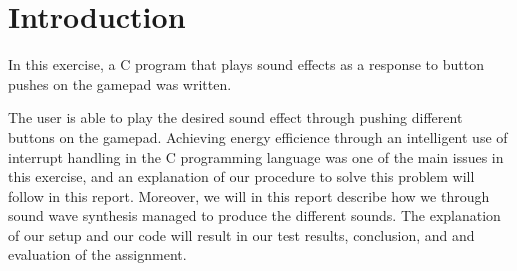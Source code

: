 \section{Introduction}

In this exercise, a C program that plays sound effects as a response to button pushes on the gamepad was written.

The user is able to play the desired sound effect through pushing different buttons on the gamepad.
Achieving energy efficience through an intelligent use of interrupt handling in the C programming language was one of the main issues in this exercise, and an explanation of our procedure to solve this problem will follow in this report.
Moreover, we will in this report describe how we through sound wave synthesis managed to produce the different sounds.
The explanation of our setup and our code will result in our test results, conclusion, and and evaluation of the assignment.
